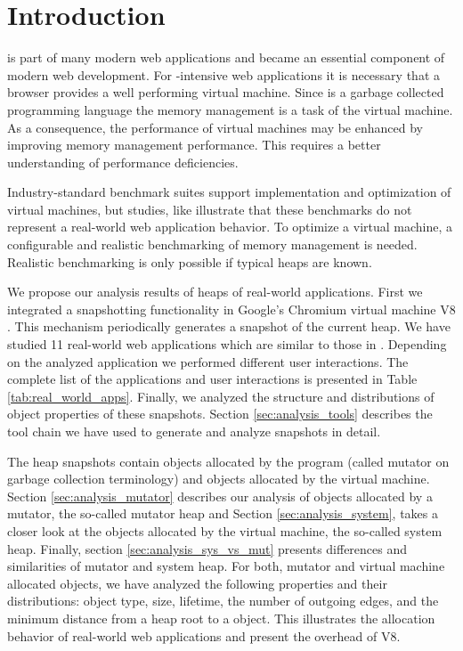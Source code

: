 
\section{Introduction}

\JS is part of many modern web applications and became an essential component
of modern web development. For \JS-intensive web applications it is
necessary that a browser provides a well performing \JS virtual machine. Since
\JS is a garbage collected programming language the memory management is a task
of the virtual machine. As a consequence, the performance of \JS virtual
machines may be enhanced by improving memory management performance. This
requires a better understanding of performance deficiencies.

Industry-standard benchmark suites support implementation and optimization of
\JS virtual machines, but studies, like \cite{JSMeter2009} illustrate that
these benchmarks do not represent a real-world web application behavior. To
optimize a \JS virtual machine, a configurable and realistic benchmarking of
memory management is needed. Realistic benchmarking is only possible if typical
\JS heaps are known.

We propose our analysis results of \JS heaps of real-world applications. First
we integrated a snapshotting functionality in Google's Chromium \cite{Chromium}
virtual machine V8 \cite{V8}. This mechanism periodically generates a snapshot
of the current \JS heap. We have studied 11 real-world web applications which
are similar to those in \cite{JSMeter2009}. Depending on the analyzed
application we performed different user interactions. The complete list of the
applications and user interactions is presented in Table
\ref{tab:real_world_apps}. Finally, we analyzed the structure and distributions
of object properties of these snapshots. Section \ref{sec:analysis_tools}
describes the tool chain we have used to generate and analyze snapshots in
detail.

The heap snapshots contain objects allocated by the \JS program (called mutator
on garbage collection terminology) and objects allocated by the virtual
machine. Section \ref{sec:analysis_mutator} describes our analysis of objects
allocated by a mutator, the so-called mutator heap and Section
\ref{sec:analysis_system}, takes a closer look at the objects allocated by the
virtual machine, the so-called system heap. Finally, section
\ref{sec:analysis_sys_vs_mut} presents differences and similarities of mutator
and system heap. For both, mutator and virtual machine allocated objects, we
have analyzed the following properties and their distributions: object type,
size, lifetime, the number of outgoing edges, and the minimum distance from a
heap root to a object. This illustrates the allocation behavior of real-world
web applications and present the overhead of V8.

